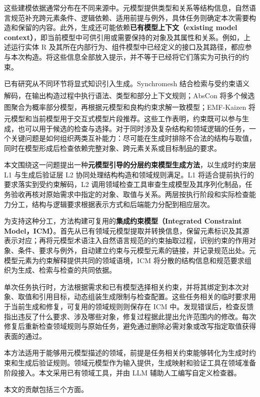 \documentclass[pdflatex,iicol,sn-mathphys-num]{sn-jnl}
\newcommand{\paperref}[1]{\textsuperscript{\textcolor{citationred}{\citep{#1}}}}
\begin{document}
这些建模依据通常分布在不同来源中。元模型提供类型和关系等结构信息，自然语言规范补充跨元素条件、逻辑依赖、适用前提与例外，具体任务则确定本次需要构造和保留的内容。此外，生成还可能依赖\textbf{已有模型上下文（existing model context）}，即当前模型中可供引用或需要保持的对象及其属性和关系。例如，上述运行实体 R 及其所在内部行为、组件模型中已经定义的接口及其路径，都应参与本次构造。将这些信息全部放入提示，并不等于已经将它们落实为可执行的约束。


已有研究从不同环节将显式知识引入生成。Synchromesh 结合检索与受约束语义解码，在输出构造过程中执行语法、类型和部分上下文规则\paperref{poesia2022synchromesh}；AbsCon 将多个候选图聚合为概率部分模型，再根据元模型和良构约束求解一致模型\paperref{Chen_2025}；EMF-Kaizen 将元模型和当前模型用于交互式模型片段推荐\paperref{JOT:issue_2026_03/a8}。这些工作表明，约束既可以参与生成，也可以用于候选的检查与选择。对于同时涉及复杂结构和领域逻辑的任务，一个关键问题是如何组织两类互补能力：尽可能在生成时排除不合法的结构与取值，同时在模型形成后检查依赖完整对象、跨元素关系或目标制品的要求。


本文围绕这一问题提出一种\textbf{元模型引导的分层约束模型生成方法}，以生成时约束层 L1 与生成后验证层 L2 协同处理结构构造和领域规则满足。L1 将适合提前执行的要求落实到受约束解码，L2 调用领域检查工具审查生成模型及其序列化制品，任务验收再核对原始需求中指定的对象、取值与关系。两层按执行阶段和实际检查能力分工，结构与逻辑要求根据表示方式和后端能力分配到相应层次。


为支持这种分工，方法构建可复用的\textbf{集成约束模型（Integrated Constraint Model，ICM）}。首先从已有领域元模型提取并转换信息，保留元素标识及其源表示对应；再将元模型术语注入自然语言规范的约束抽取过程，识别约束的作用对象、条件、要求与例外，自动建立约束与元模型元素的链接，并记录规范出处。元模型元素为约束解释提供共同的领域语境，ICM 将分散的结构信息和规范要求组织为生成、检索与检查的共同依据。


单次任务执行时，方法根据需求和已有模型选择相关约束，并将其绑定到本次对象、取值和引用目标，动态组装生成限制与检查配置。这些任务相关的临时要求用于当前生成和修复，可复用的领域规则则保存在 ICM 中。发现错误后，检查反馈指出违反了什么要求、涉及哪些对象，修复过程据此提出允许范围内的修改。每次修复后重新检查领域规则与原始任务，避免通过删除必需对象或改写指定取值获得表面的通过。


本方法适用于能够用元模型描述的领域，前提是任务相关约束能够转化为生成时约束和生成后验证规则。领域元模型作为输入提供，生成映射和验证工具在领域准备阶段接入。本文采用已有领域工具，并由 LLM 辅助人工编写自定义检查器。


本文的贡献包括三个方面。
\end{document}
